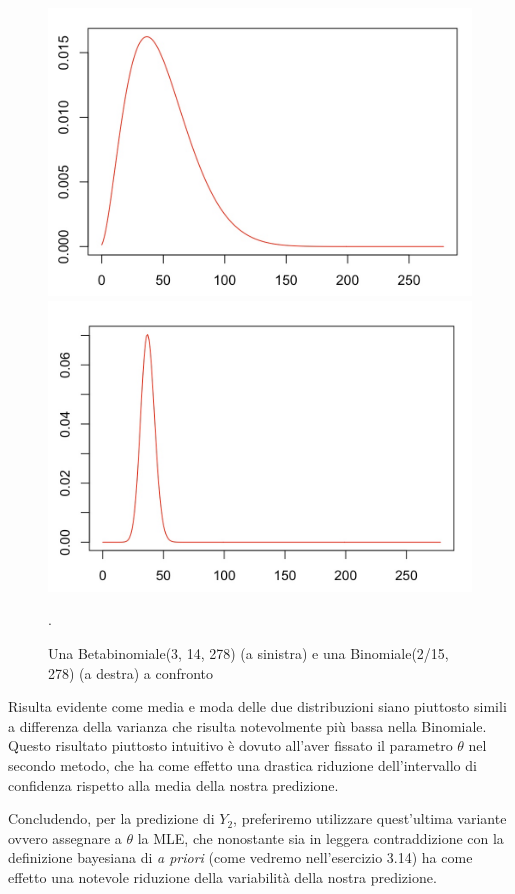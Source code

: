 \begin{figure}[!ht]
\begin{minipage}[b]{0.47\textwidth}
\centering
\includegraphics[width=\textwidth]{img/esercizio3-07-BetaBinomiale}
\end{minipage}
\hfill
\begin{minipage}[b]{0.47\textwidth}
\centering
\includegraphics[width=\textwidth]{img/esercizio3-07-Binomiale}
\end{minipage}
\caption{Una Betabinomiale(3, 14, 278) (a sinistra) e una Binomiale(2/15, 278) (a destra) a confronto}.
\label{fig:Binomiale}
\end{figure}

Risulta evidente come media e moda delle due distribuzioni siano piuttosto simili a 
differenza della varianza che risulta notevolmente più bassa nella Binomiale. 
Questo risultato piuttosto intuitivo è dovuto all'aver fissato il parametro $\theta$ 
nel secondo metodo, che ha come effetto una drastica riduzione dell'intervallo di 
confidenza rispetto alla media della nostra predizione. 

Concludendo, per la  predizione di $Y_2$, preferiremo utilizzare quest'ultima variante 
ovvero assegnare a $\theta$ la MLE, che nonostante sia in leggera contrad\-dizione con 
la definizione bayesiana di \textit{a priori} (come vedremo nell'esercizio 3.14) ha 
come effetto una notevole riduzione della variabilità della nostra predizione.